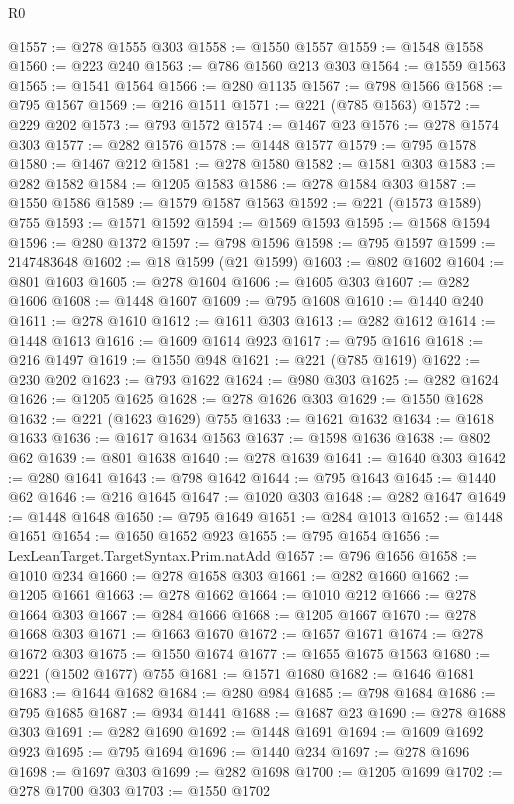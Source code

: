 \begin{lexlean}{R0}
\begin{coremodule}
@1557 := @278 @1555 @303
@1558 := @1550 @1557
@1559 := @1548 @1558
@1560 := @223 @240
@1563 := @786 @1560 @213 @303
@1564 := @1559 @1563
@1565 := @1541 @1564
@1566 := @280 @1135
@1567 := @798 @1566
@1568 := @795 @1567
@1569 := @216 @1511
@1571 := @221 (@785 @1563)
@1572 := @229 @202
@1573 := @793 @1572
@1574 := @1467 @23
@1576 := @278 @1574 @303
@1577 := @282 @1576
@1578 := @1448 @1577
@1579 := @795 @1578
@1580 := @1467 @212
@1581 := @278 @1580
@1582 := @1581 @303
@1583 := @282 @1582
@1584 := @1205 @1583
@1586 := @278 @1584 @303
@1587 := @1550 @1586
@1589 := @1579 @1587 @1563
@1592 := @221 (@1573 @1589) @755
@1593 := @1571 @1592
@1594 := @1569 @1593
@1595 := @1568 @1594
@1596 := @280 @1372
@1597 := @798 @1596
@1598 := @795 @1597
@1599 := 2147483648
@1602 := @18 @1599 (@21 @1599)
@1603 := @802 @1602
@1604 := @801 @1603
@1605 := @278 @1604
@1606 := @1605 @303
@1607 := @282 @1606
@1608 := @1448 @1607
@1609 := @795 @1608
@1610 := @1440 @240
@1611 := @278 @1610
@1612 := @1611 @303
@1613 := @282 @1612
@1614 := @1448 @1613
@1616 := @1609 @1614 @923
@1617 := @795 @1616
@1618 := @216 @1497
@1619 := @1550 @948
@1621 := @221 (@785 @1619)
@1622 := @230 @202
@1623 := @793 @1622
@1624 := @980 @303
@1625 := @282 @1624
@1626 := @1205 @1625
@1628 := @278 @1626 @303
@1629 := @1550 @1628
@1632 := @221 (@1623 @1629) @755
@1633 := @1621 @1632
@1634 := @1618 @1633
@1636 := @1617 @1634 @1563
@1637 := @1598 @1636
@1638 := @802 @62
@1639 := @801 @1638
@1640 := @278 @1639
@1641 := @1640 @303
@1642 := @280 @1641
@1643 := @798 @1642
@1644 := @795 @1643
@1645 := @1440 @62
@1646 := @216 @1645
@1647 := @1020 @303
@1648 := @282 @1647
@1649 := @1448 @1648
@1650 := @795 @1649
@1651 := @284 @1013
@1652 := @1448 @1651
@1654 := @1650 @1652 @923
@1655 := @795 @1654
@1656 := LexLeanTarget.TargetSyntax.Prim.natAdd
@1657 := @796 @1656
@1658 := @1010 @234
@1660 := @278 @1658 @303
@1661 := @282 @1660
@1662 := @1205 @1661
@1663 := @278 @1662
@1664 := @1010 @212
@1666 := @278 @1664 @303
@1667 := @284 @1666
@1668 := @1205 @1667
@1670 := @278 @1668 @303
@1671 := @1663 @1670
@1672 := @1657 @1671
@1674 := @278 @1672 @303
@1675 := @1550 @1674
@1677 := @1655 @1675 @1563
@1680 := @221 (@1502 @1677) @755
@1681 := @1571 @1680
@1682 := @1646 @1681
@1683 := @1644 @1682
@1684 := @280 @984
@1685 := @798 @1684
@1686 := @795 @1685
@1687 := @934 @1441
@1688 := @1687 @23
@1690 := @278 @1688 @303
@1691 := @282 @1690
@1692 := @1448 @1691
@1694 := @1609 @1692 @923
@1695 := @795 @1694
@1696 := @1440 @234
@1697 := @278 @1696
@1698 := @1697 @303
@1699 := @282 @1698
@1700 := @1205 @1699
@1702 := @278 @1700 @303
@1703 := @1550 @1702

\end{coremodule}
\end{lexlean}
